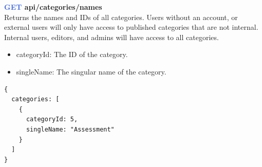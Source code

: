 \documentclass[onecolumn, draftclsnofoot,10pt, compsoc, usenames, dvipsnames]{IEEEtran}
\begin{document}
\noindent
\textbf{\textcolor{RoyalBlue}{GET} api/categories/names} \\
Returns the names and IDs of all categories. Users without an account, or external users will only have access to published categories that are not internal. Internal users, editors, and admins will have access to all categories.
\begin{itemize}
    \item categoryId: The ID of the category.
    \item singleName: The singular name of the category.
\end{itemize}
\begin{lstlisting}[caption=Example Response]
{ 
  categories: [
    {
      categoryId: 5,
      singleName: "Assessment"
    }
  ]
}
\end{lstlisting}
\\~\\
\end{document}
